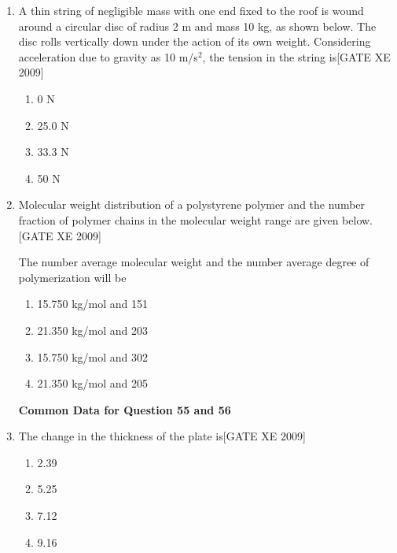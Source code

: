 \documentclass[journal,12pt,onecolumn]{IEEEtran}
\theoremstyle{remark}
\begin{document}
\begin{enumerate}
\begin{multicols}{2}
\begin{enumerate}
    \item 120 MPa
    \item 210 MPa
    \item 153 MPa
    \item 390 MPa
\end{enumerate}
\end{multicols}



\item A thin string of negligible mass with one end fixed to the roof is wound around a circular disc of radius 2 m and mass 10 kg, as shown below. The disc rolls vertically down under the action of its own weight. Considering acceleration due to gravity as 10 m/s$^2$, the tension in the string is\hfill[GATE XE 2009]

\begin{multicols}{2}
\begin{enumerate}
    \item 0 N
    \item 25.0 N
    \item 33.3 N
    \item 50 N
\end{enumerate}
\end{multicols}

\item {Molecular weight distribution of a polystyrene polymer and the number fraction of polymer chains in the molecular weight range are given below.}\hfill[GATE XE 2009]





The number average molecular weight and the number average degree of polymerization will be

\begin{enumerate}
    

    \item 15.750 kg/mol and 151
    \item 21.350 kg/mol and 203
    \item15.750 kg/mol and 302
    \item 21.350 kg/mol and 205
\end{enumerate}


\textbf{Common Data for Question 55 and 56}
\item The change in the thickness of the plate is\hfill[GATE XE 2009]
\begin{multicols}{2}
\begin{enumerate}
    \item 2.39 
    \item 5.25 
    \item 7.12 
    \item 9.16 
\end{enumerate}
\end{multicols}




\end{enumerate}
\end{document}
